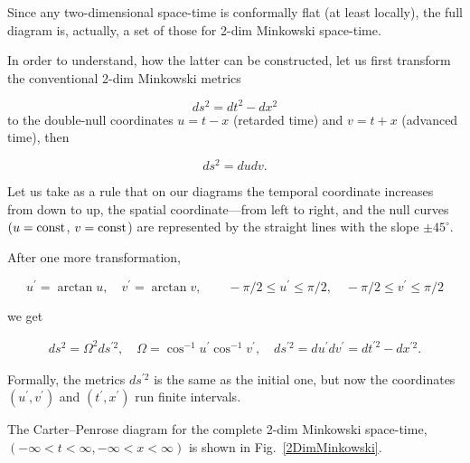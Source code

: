 Since any two-dimensional space-time is conformally flat (at least locally), the full diagram is, actually, a set of those for 2-dim Minkowski space-time. 

In order to understand, how the latter can be constructed, let us first transform the conventional 2-dim Minkowski metrics  

$$

ds^2 = dt^2 - dx^2 

$$  to the double-null coordinates $u = t -x$ (retarded time) and $v = t + x$ (advanced time), then 

$$

ds^2 = du dv

.$$

Let us take as a rule that on our diagrams the temporal coordinate increases from down to up, the spatial coordinate---from left to right, and the null curves  $(u = \rm const$, $ v = \rm const$) are represented by the straight lines with the slope $\pm 45^{\circ}$. 

After one more transformation,

$$

u^{\prime} = \arctan {u} , 

\quad 

v^{\prime} = \arctan {v},

\qquad 

- {\pi}/{2} \le u^{\prime} \le {\pi }/{2}, 

\quad 

- {\pi}/{2} \le v^{\prime} \le {\pi }/{2}

$$

we get

\begin{eqnarray}

ds^2 = \Omega ^2 ds^{\prime 2} , \quad  

\Omega = \cos^{-1} u^{\prime} \cos^{-1} v^{\prime}, 

\quad 

ds^{\prime 2} = du^{\prime} dv^{\prime} = dt^{\prime 2} - dx^{\prime 2} .

\end{eqnarray}

Formally, the metrics $ds^{\prime 2}$ is the same as the initial one, but now the coordinates $(u^{\prime}, v^{\prime})$ and $(t^{\prime}, x^{\prime})$ run finite intervals. 

The Carter--Penrose diagram for the complete 2-dim Minkowski space-time, $( - \infty < t < \infty, -\infty < x < \infty)$ is shown in Fig.~\ref{2DimMinkowski}.

